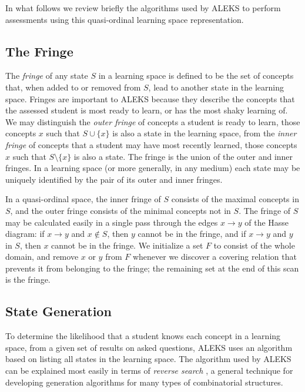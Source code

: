 \documentclass[11pt]{llncs}
\begin{document}
{In what follows we review briefly the algorithms used by ALEKS to perform assessments using this quasi-ordinal learning space representation.

\subsection{The Fringe}

The \emph{fringe} of any state $S$ in a learning space is defined to be the set of concepts that, when added to or removed from $S$, lead to another state in the learning space. Fringes are important to ALEKS because they describe the concepts that the assessed student is most ready to learn, or has the most shaky learning of. We may distinguish the \emph{outer fringe} of concepts a student is ready to learn, those concepts $x$ such that $S\cup\{x\}$ is also a state in the learning space, from the \emph{inner fringe} of concepts that a student may have most recently learned, those concepts $x$ such that $S\setminus\{x\}$ is also a state. The fringe is the union of the outer and inner fringes. In a learning space (or more generally, in any medium) each state may be uniquely identified by the pair of its outer and inner fringes.

In a quasi-ordinal space, the inner fringe of $S$ consists of the maximal concepts in $S$, and the outer fringe consists of the minimal concepts not in $S$. The fringe of $S$ may be calculated easily in a single pass through the edges $x\rightarrow y$ of the Hasse diagram: if $x\rightarrow y$ and $x\notin S$, then $y$ cannot be in the fringe, and if $x\rightarrow y$ and $y$ in $S$, then $x$ cannot be in the fringe.  We initialize a set $F$ to consist of the whole domain, and remove $x$ or $y$ from $F$ whenever we discover a covering relation that prevents it from belonging to the fringe; the remaining set at the end of this scan is the fringe.

\subsection{State Generation}

To determine the likelihood that a student knows each concept in a learning space, from a given set of results on asked questions, ALEKS uses an algorithm based on listing all states in the learning space. The algorithm used by ALEKS can be explained most easily in terms of \emph{reverse search} \citep{avis96}, a general technique for developing generation algorithms for many types of combinatorial structures.

}
\end{document}

